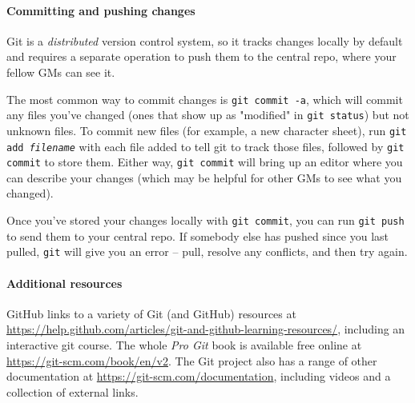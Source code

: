 \documentclass[green]{testgame}
\begin{document}
\paragraph*{Committing and pushing changes}

Git is a \emph{distributed} version control system, so it tracks changes locally by default and requires a separate operation to push them to the central repo, where your fellow GMs can see it.

The most common way to commit changes is \texttt{git commit -a}, which will commit any files you've changed (ones that show up as "modified" in \texttt{git status}) but not unknown files. To commit new files (for example, a new character sheet), run \texttt{git add \emph{filename}} with each file added to tell git to track those files, followed by \texttt{git commit} to store them. Either way, \texttt{git commit} will bring up an editor where you can describe your changes (which may be helpful for other GMs to see what you changed).

Once you've stored your changes locally with \texttt{git commit}, you can run \texttt{git push} to send them to your central repo. If somebody else has pushed since you last pulled, \texttt{git} will give you an error -- pull, resolve any conflicts, and then try again.

\paragraph*{Additional resources}

GitHub links to a variety of Git (and GitHub) resources at \url{https://help.github.com/articles/git-and-github-learning-resources/}, including an interactive git course. The whole \emph{Pro Git} book is available free online at \url{https://git-scm.com/book/en/v2}. The Git project also has a range of other documentation at \url{https://git-scm.com/documentation}, including videos and a collection of external links.
\end{document}
